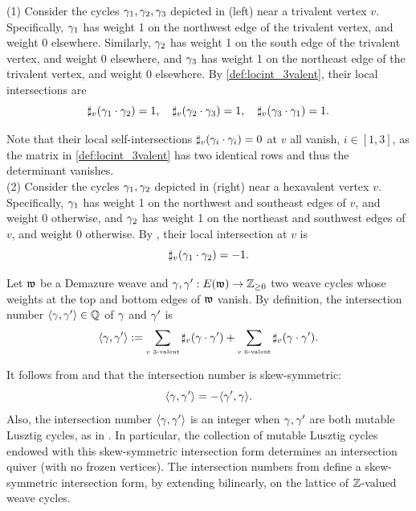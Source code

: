 \begin{example}\label{ex:local_intersection} (1) Consider the cycles $\gamma_1,\gamma_2,\gamma_3$ depicted in  (left) near a trivalent vertex $v$. Specifically, $\gamma_1$ has weight 1 on the northwest edge of the trivalent vertex, and weight 0 elsewhere. Similarly, $\gamma_2$ has weight 1 on the south edge of the trivalent vertex, and weight 0 elsewhere, and $\gamma_3$ has weight 1 on the northeast edge of the trivalent vertex, and weight 0 elsewhere. By \cref{def:locint_3valent}, their local intersections are
$$\sharp_{v}(\gamma_1\cdot \gamma_2)=1,\quad \sharp_{v}(\gamma_2\cdot \gamma_3)=1,\quad\sharp_{v}(\gamma_3\cdot \gamma_1)=1.$$

\noindent Note that their local self-intersections $\sharp_{v}(\gamma_i\cdot \gamma_i)=0$ at $v$ all vanish, $i\in[1,3]$, as the matrix in \cref{def:locint_3valent} has two identical rows and thus the determinant vanishes.\\

\noindent (2) Consider the cycles $\gamma_1,\gamma_2$ depicted in  (right) near a hexavalent vertex $v$. Specifically, $\gamma_1$ has weight 1 on the northwest and southeast edges of $v$, and weight 0 otherwise, and $\gamma_2$ has weight 1 on the northeast and southwest edges of  $v$, and weight 0 otherwise. By , their local intersection at $v$ is
$$\sharp_{v}(\gamma_1\cdot \gamma_2)=-1.$$
\sbs
\end{example}

\begin{definition}\label{def:intersection_number}
Let $\mathfrak{w}$ be a Demazure weave and $\gamma,\gamma':E(\mathfrak{w})\to\mathbb{Z}_{\geq0}$ two weave cycles whose weights at the top and bottom edges of $\mathfrak{w}$ vanish. By definition, the intersection number $\langle\gamma, \gamma'\rangle\in\mathbb{Q}$ of $\gamma$ and $\gamma'$ is
\begin{equation}\label{eq:intersection_form}
\langle\gamma, \gamma'\rangle := \sum_{\mbox{\tiny $v$ 3-valent}}\sharp_{v}(\gamma \cdot \gamma') + \sum_{\mbox{\tiny $v$ 6-valent}}\sharp_{v}(\gamma\cdot \gamma').
\end{equation}
\sbs
\end{definition}

\noindent It follows from  and  that the intersection number is skew-symmetric:
$$\langle\gamma, \gamma'\rangle = -\langle\gamma', \gamma\rangle.$$
Also, the intersection number $\langle\gamma, \gamma'\rangle$ is an integer when $\gamma, \gamma'$ are both mutable Lusztig cycles, as in . In particular, the collection of mutable Lusztig cycles endowed with this skew-symmetric intersection form determines an intersection quiver (with no frozen vertices). The intersection numbers from  define a skew-symmetric intersection form, by extending bilinearly, on the lattice of $\mathbb{Z}$-valued weave cycles.

